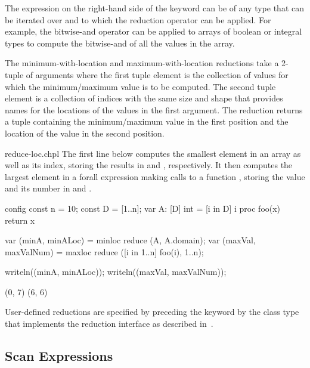 The expression on the right-hand side of the  keyword
can be of any type that can be iterated over and to which the
reduction operator can be applied.  For example, the bitwise-and
operator can be applied to arrays of boolean or integral types to
compute the bitwise-and of all the values in the array.

The minimum-with-location and maximum-with-location reductions take a
2-tuple of arguments where the first tuple element is the collection
of values for which the minimum/maximum value is to be computed.  The
second tuple element is a collection of indices with the same size and
shape that provides names for the locations of the values in the first
argument.  The reduction returns a tuple containing the
minimum/maximum value in the first position and the location of the
value in the second position.

\begin{chapelexample}{reduce-loc.chpl}
The first line below computes the smallest element in an array
 as well as its index, storing the results in  and
, respectively.  It then computes the largest element in
a forall expression making calls to a function , storing
the value and its number in  and .
\begin{chapelnoprint}
config const n = 10;
const D = [1..n];
var A: [D] int = [i in D] i %
proc foo(x) return x %
\end{chapelnoprint}
\begin{chapel}
var (minA, minALoc) = minloc reduce (A, A.domain); 
var (maxVal, maxValNum) = maxloc reduce ([i in 1..n] foo(i), 1..n);
\end{chapel}
\begin{chapelnoprint}
writeln((minA, minALoc));
writeln((maxVal, maxValNum));
\end{chapelnoprint}
\begin{chapeloutput}
(0, 7)
(6, 6)
\end{chapeloutput}
\end{chapelexample}

User-defined reductions are specified by preceding the
keyword  by the class type that implements the reduction
interface as described in~.

\subsection{Scan Expressions}
\label{scan}

